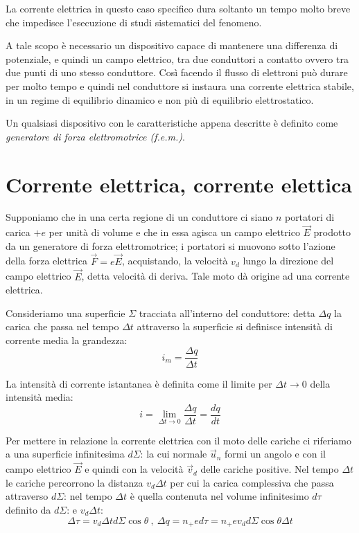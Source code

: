\documentclass[class=book, crop=false, oneside, 12pt]{standalone}
\begin{document}
La corrente elettrica in questo caso specifico dura soltanto un tempo molto breve che impedisce l'esecuzione di studi sistematici del fenomeno. 

A tale scopo è necessario un dispositivo capace di mantenere una differenza di potenziale, e quindi un campo elettrico, tra due conduttori a contatto ovvero tra due punti di uno stesso conduttore. 
Così facendo il flusso di elettroni può durare per molto tempo e quindi nel conduttore si instaura una corrente elettrica stabile, in un regime di equilibrio dinamico e non più di equilibrio elettrostatico.

Un qualsiasi dispositivo con le caratteristiche appena descritte è definito come \emph{generatore di forza elettromotrice (f.e.m.)}.

\section{Corrente elettrica, corrente elettica}

Supponiamo che in una certa regione di un conduttore ci siano \(n\) portatori di carica \(+e\) per unità di volume e che in essa agisca un campo elettrico \(\overrightarrow{E}\) prodotto da un generatore di forza elettromotrice; i portatori si muovono sotto l'azione della forza elettrica \(\overrightarrow{F} = e \overrightarrow{E}\), acquistando, la velocità \(v_d\) lungo la direzione del campo elettrico \(\overrightarrow{E}\), detta velocità di deriva. 
Tale moto dà origine ad una corrente elettrica.

Consideriamo una superficie \(\Sigma\) tracciata all'interno del conduttore: detta \(\Delta q\) la carica che passa nel tempo \(\Delta t\) attraverso la superficie si definisce intensità di corrente media la grandezza:
\begin{equation*}
    i_m = \frac{\Delta q}{\Delta t}
\end{equation*}

La intensità di corrente istantanea è definita come il limite per \(\Delta t \rightarrow 0\) della intensità media:
\begin{equation*}
    i = \lim_{\Delta t \rightarrow 0 } \frac{\Delta q}{\Delta t} = \frac{dq}{dt}
\end{equation*} 

Per mettere in relazione la corrente elettrica con il moto delle cariche ci riferiamo a una superficie infinitesima \(d\Sigma\): la cui normale \(\overrightarrow{u}_n\) formi un angolo e con il campo elettrico \(\overrightarrow{E}\) e quindi con la velocità \(\overrightarrow{v}_d\) delle cariche positive. 
Nel tempo \(\Delta t\) le cariche percorrono la distanza \(v_d \Delta t\) per cui la carica complessiva che passa attraverso \(d\Sigma\): nel tempo \(\Delta t\) è quella contenuta nel volume infinitesimo \(d \tau\) definito da \(d \Sigma\): e \(v_d \Delta t\):
\begin{equation*}
    \Delta \tau = v_d \Delta t d \Sigma \cos \theta \ , \ \Delta q = n_{+} e d \tau = n_{+} e v_d d \Sigma \cos \theta \Delta t
\end{equation*}
\end{document}
